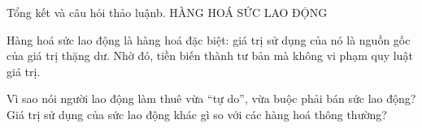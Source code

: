 \documentclass[aspectratio=169,11pt]{beamer}
\begin{document}
\begin{frame}{Tổng kết và câu hỏi thảo luận}{b. HÀNG HOÁ SỨC LAO ĐỘNG}
\begin{Takeaway}Hàng hoá sức lao động là hàng hoá đặc biệt: giá trị sử dụng của nó là nguồn gốc của giá trị thặng dư. Nhờ đó, tiền biến thành tư bản mà không vi phạm quy luật giá trị.\end{Takeaway}
\begin{CQ}Vì sao nói người lao động làm thuê vừa “tự do”, vừa buộc phải bán sức lao động? Giá trị sử dụng của sức lao động khác gì so với các hàng hoá thông thường?\end{CQ}
\end{frame}
\end{document}
